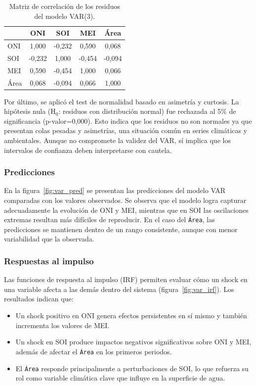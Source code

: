 \begin{table}[H]
    \centering
    \caption{Matriz de correlación de los residuos del modelo VAR(3).}
    \label{tab:var_corr_resid}
    \begin{tabular}{lcccc}
        \toprule
               & ONI & SOI & MEI & Área \\
        \midrule
        ONI     & 1,000 & -0,232 &  0,590 &  0,068 \\
        SOI     & -0,232 & 1,000 & -0,454 & -0,094 \\
        MEI     & 0,590 & -0,454 &  1,000 &  0,066 \\
        Área    & 0,068 & -0,094 &  0,066 &  1,000 \\
        \bottomrule
    \end{tabular}
\end{table}

Por último, se aplicó el test de normalidad basado en asimetría y curtosis. La hipótesis nula (H$_0$: residuos con distribución normal) fue rechazada al 5\% de significancia (p-valor=0,000). Esto indica que los residuos no son normales ya que presentan colas pesadas y asimetrías, una situación común en series climáticas y ambientales. Aunque no compromete la validez del VAR, sí implica que los intervalos de confianza deben interpretarse con cautela.

\subsubsection{Predicciones}
En la figura~\ref{fig:var_pred} se presentan las predicciones del modelo VAR comparadas con los valores observados. Se observa que el modelo logra capturar adecuadamente la evolución de ONI y MEI, mientras que en SOI las oscilaciones extremas resultan más difíciles de reproducir. En el caso del \texttt{Área}, las predicciones se mantienen dentro de un rango consistente, aunque con menor variabilidad que la observada.

\subsubsection{Respuestas al impulso}
Las funciones de respuesta al impulso (IRF) permiten evaluar cómo un shock en una variable afecta a las demás dentro del sistema (figura~\ref{fig:var_irf}). Los resultados indican que:

\begin{itemize}
    \item Un shock positivo en ONI genera efectos persistentes en sí mismo y también incrementa los valores de MEI.
    \item Un shock en SOI produce impactos negativos significativos sobre ONI y MEI, además de afectar el \texttt{Área} en los primeros periodos.
    \item El \texttt{Área} responde principalmente a perturbaciones de SOI, lo que refuerza su rol como variable climática clave que influye en la superficie de agua.
\end{itemize}


